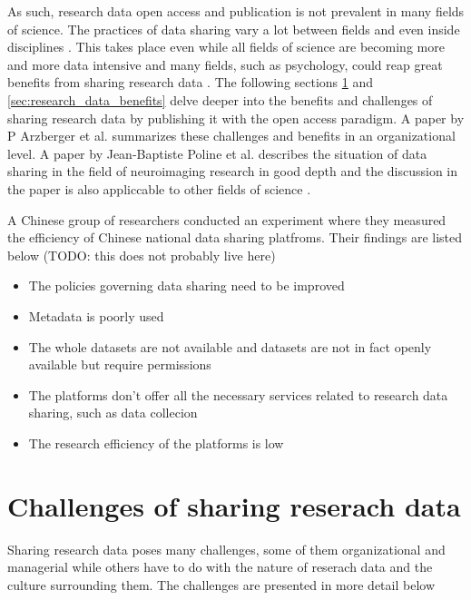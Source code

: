 As such, research data open access and publication is not prevalent in many
fields of science. The practices of data sharing vary a lot between fields and
even inside disciplines \cite{DBLP:journals/jasis/Borgman12}
\cite{cragin2010data}. This takes place even while all fields of science are
becoming more and more data intensive and many fields, such as psychology,
could reap great benefits from sharing research data
\cite{DBLP:books/ms/4paradigm09} \cite{wicherts2006poor}. The following
sections \ref{sec:research_data_challenges} and \ref{sec:research_data_benefits}
delve deeper into the benefits and challenges of sharing research data by
publishing it with the open access paradigm. A paper by P Arzberger et al.
\cite{DBLP:journals/datascience/ArzbergerSBBCLMUW04} summarizes these
challenges and benefits in an organizational level. A paper by Jean-Baptiste
Poline et al. describes the situation of data sharing in the field of
neuroimaging research in good depth and the discussion in the paper is also
appliccable to other fields of science
\cite{DBLP:journals/fini/PolineBGGHHHHKMPSAK12}.

A Chinese group of researchers conducted an experiment where they measured the
efficiency of Chinese national data sharing platfroms. Their findings are
listed below \cite{DBLP:journals/lht/SiLZXHLX15} (TODO: this does not probably
live here)

\begin{itemize}
    \item The policies governing data sharing need to be improved
    \item Metadata is poorly used
    \item The whole datasets are not available and datasets are not in fact
          openly available but require permissions
    \item The platforms don't offer all the necessary services related to
          research data sharing, such as data collecion
    \item The research efficiency of the platforms is low
\end{itemize}


\section{Challenges of sharing reserach data}
\label{sec:research_data_challenges}

Sharing research data poses many challenges, some of them organizational and
managerial while others have to do with the nature of reserach data and the
culture surrounding them. The challenges are presented in more detail below
\cite{DBLP:journals/datascience/ArzbergerSBBCLMUW04}
\cite{tenopir2011data}

